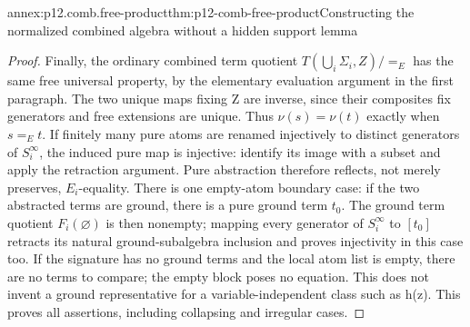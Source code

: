 \begin{annexitem}{annex:p12.comb.free-product}{thm:p12-comb-free-product}{Constructing the normalized combined algebra without a hidden support lemma}
\begin{proof}
Finally, the ordinary combined term quotient \(T(\bigcup_i\Sigma_i,Z)/{=_E}\)
has the same free universal property, by the elementary evaluation
argument in the first paragraph. The two unique maps fixing Z are
inverse, since their composites fix generators and free extensions
are unique. Thus \(\nu(s)=\nu(t)\) exactly when \(s=_Et\).
If finitely many pure atoms are renamed injectively to distinct
generators of \(S_i^\infty\), the induced pure map is injective:
identify its image with a subset and apply the retraction argument.
Pure abstraction therefore reflects, not merely preserves,
\(E_i\)-equality. There is one empty-atom boundary case: if the two
abstracted terms are ground, there is a pure ground term \(t_0\).
The ground term quotient \(F_i(\varnothing)\) is then nonempty;
mapping every generator of \(S_i^\infty\) to \([t_0]\) retracts
its natural ground-subalgebra inclusion and proves injectivity in
this case too. If the signature has no ground terms and the local
atom list is empty, there are no terms to compare; the empty block
poses no equation. This does not invent a ground representative for
a variable-independent class such as h(z).
This proves all assertions, including collapsing and
irregular cases.
\end{proof}
\end{annexitem}

